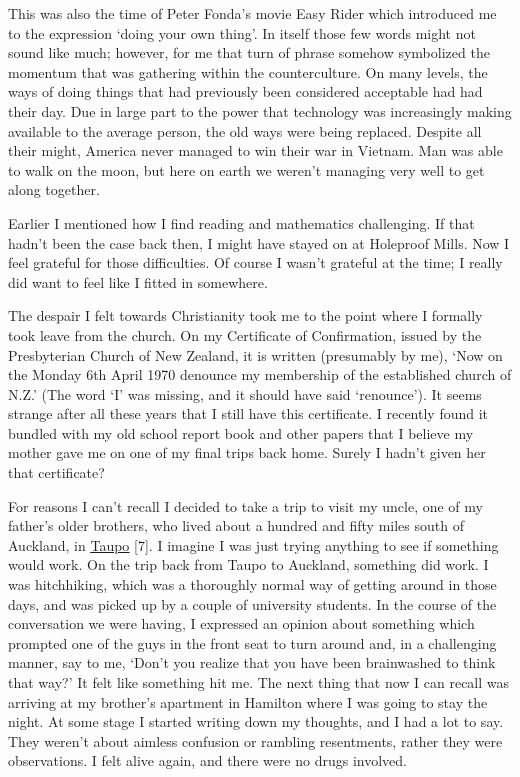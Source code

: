 This was also the time of Peter Fonda's movie Easy Rider which
introduced me to the expression `doing your own thing'. In itself those
few words might not sound like much; however, for me that turn of phrase
somehow symbolized the momentum that was gathering within the
counterculture. On many levels, the ways of doing things that had
previously been considered acceptable had had their day. Due in large
part to the power that technology was increasingly making available to
the average person, the old ways were being replaced. Despite all their
might, America never managed to win their war in Vietnam. Man was able
to walk on the moon, but here on earth we weren't managing very well to
get along together.

Earlier I mentioned how I find reading and mathematics challenging. If
that hadn't been the case back then, I might have stayed on at Holeproof
Mills. Now I feel grateful for those difficulties. Of course I wasn't
grateful at the time; I really did want to feel like I fitted in
somewhere.

The despair I felt towards Christianity took me to the point where I
formally took leave from the church. On my Certificate of Confirmation,
issued by the Presbyterian Church of New Zealand, it is written
(presumably by me), `Now on the Monday 6th April 1970 denounce my
membership of the established church of N.Z.' (The word `I' was missing,
and it should have said `renounce'). It seems strange after all these
years that I still have this certificate. I recently found it bundled
with my old school report book and other papers that I believe my mother
gave me on one of my final trips back home. Surely I hadn't given her
that certificate?

For reasons I can't recall I decided to take a trip to visit my uncle,
one of my father's older brothers, who lived about a hundred and fifty
miles south of Auckland, in
\href{https://www.newzealand.com/uk/taupo/}{\underline{Taupo}} {[}7{]}.
I imagine I was just trying anything to see if something would work. On
the trip back from Taupo to Auckland, something did work. I was
hitchhiking, which was a thoroughly normal way of getting around in
those days, and was picked up by a couple of university students. In the
course of the conversation we were having, I expressed an opinion about
something which prompted one of the guys in the front seat to turn
around and, in a challenging manner, say to me, `Don't you realize that
you have been brainwashed to think that way?' It felt like something hit
me. The next thing that now I can recall was arriving at my brother's
apartment in Hamilton where I was going to stay the night. At some stage
I started writing down my thoughts, and I had a lot to say. They weren't
about aimless confusion or rambling resentments, rather they were
observations. I felt alive again, and there were no drugs involved.


